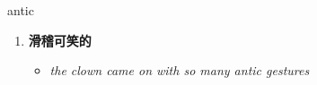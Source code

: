 
\begin{frame}
{\huge antic}
\begin{center}
\begin{enumerate}\Large
  \item \textbf{滑稽可笑的}
  \begin{itemize}
    \item \em{\Large{the clown came on with so many antic gestures}}
  \end{itemize}
\end{enumerate}
\end{center}
\end{frame}

